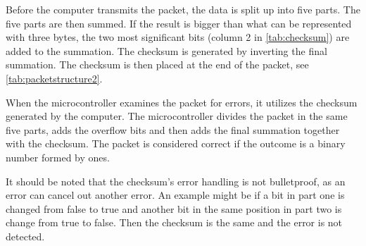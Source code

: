 Before the computer transmits the packet, the data is split up into five parts. The five parts are then summed. If the result is bigger than what can be represented with three bytes, the two most significant bits (column 2 in \autoref{tab:checksum}) are added to the summation. The checksum is generated by inverting the final summation. The checksum is then placed at the end of the packet, see \autoref{tab:packetstructure2}.

When the microcontroller examines the packet for errors, it utilizes the checksum generated by the computer. The microcontroller divides the packet in the same five parts, adds the overflow bits and then adds the final summation together with the checksum. The packet is considered correct if the outcome is a binary number formed by ones.

It should be noted that the checksum's error handling is not bulletproof, as an error can cancel out another error. An example might be if a bit in part one is changed from false to true and another bit in the same position in part two is change from true to false. Then the checksum is the same and the error is not detected. 

